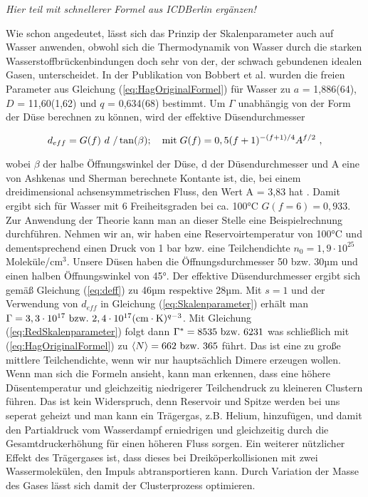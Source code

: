 \textit{Hier teil mit schnellerer Formel aus ICDBerlin ergänzen!}



Wie schon angedeutet, lässt sich das Prinzip der Skalenparameter auch auf Wasser anwenden, obwohl sich die Thermodynamik von Wasser durch die starken Wasserstoffbrückenbindungen doch sehr von der, der schwach gebundenen idealen Gasen, unterscheidet. In der Publikation von Bobbert et al. \cite{bobbert2002} wurden die freien Parameter aus Gleichung (\ref{eq:HagOriginalFormel}) für Wasser zu $a$ = 1,886(64), $D$ = 11,60(1,62) und $q$ = 0,634(68) bestimmt. Um $\Gamma$ unabhängig von der Form der Düse berechnen zu können, wird der effektive Düsendurchmesser

\begin{equation} \label{eq:deff}
d_{eff} = G(f)\ d\ /\tan(\beta); \quad \textmd{mit} \; G(f)= 0,5 (f+1)^{-(f+1)/4} A^{f/2} \ ,
\end{equation}

wobei $\beta$ der halbe Öffnungswinkel der Düse, d der Düsendurchmesser und A eine von Ashkenas und Sherman berechnete Kontante ist, die, bei einem dreidimensional achsensymmetrischen Fluss, den Wert A = 3,83 hat \cite{bobbert2002}. Damit ergibt sich für Wasser mit 6 Freiheitsgraden bei ca. 100°C $G(f=6)=0,933$. 
Zur Anwendung der Theorie kann man an dieser Stelle eine Beispielrechnung durchführen. Nehmen wir an, wir haben eine Reservoirtemperatur von 100°C und dementsprechend einen Druck von 1 bar bzw. eine Teilchendichte $n_0 = 1,9 \cdot 10^{25}$ Moleküle/cm$^{3}$. Unsere Düsen haben die Öffnungsdurchmesser 50 bzw. 30µm und einen halben Öffnungswinkel von 45°. Der effektive Düsendurchmesser ergibt sich gemäß Gleichung (\ref{eq:deff}) zu 46µm respektive 28µm. Mit $s = 1$ und der Verwendung von $d_{eff}$ in Gleichung (\ref{eq:Skalenparameter}) erhält man $\Gamma = 3,3 \cdot 10^{17}\ \textmd{bzw.} \ 2,4 \cdot 10^{17} (\mathrm{cm}\cdot \mathrm{K})^{q-3}$. Mit Gleichung (\ref{eq:RedSkalenparameter}) folgt dann $\Gamma^* = 8535\ \textmd{bzw.}\ 6231$ was schließlich mit (\ref{eq:HagOriginalFormel}) zu $\left\langle N \right\rangle = 662\ \textmd{bzw.} \ 365$ führt.
Das ist eine zu große mittlere Teilchendichte, wenn wir nur hauptsächlich Dimere erzeugen wollen. Wenn man sich die Formeln ansieht, kann man erkennen, dass eine höhere Düsentemperatur und gleichzeitig niedrigerer Teilchendruck zu kleineren Clustern führen. Das ist kein Widerspruch, denn Reservoir und Spitze werden bei uns seperat geheizt und man kann ein Trägergas, z.B. Helium, hinzufügen, und damit den Partialdruck vom Wasserdampf erniedrigen und gleichzeitig durch die Gesamtdruckerhöhung für einen höheren Fluss sorgen. Ein weiterer nützlicher Effekt des Trägergases ist, dass dieses bei Dreiköperkollisionen mit zwei Wassermolekülen, den Impuls abtransportieren kann. Durch Variation der Masse des Gases lässt sich damit der Clusterprozess optimieren.



